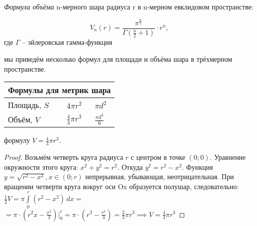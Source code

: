 \documentclass[14pt,a4paper]{report}
\begin{document}
\textit{Формула объёма} n-мерного шара радиуса r в n-мерном евклидовом пространстве:
\begin{my_frame}
$$ V_n(r)=\frac{\pi^\frac{n}{2}}{\Gamma(\frac{n}{2} + 1)}\cdot r^n, $$
где $ \Gamma $ -- эйлеровская гамма-функция \cite{olver2016nist}
\end{my_frame}

 мы приведём несколько формул для площади и объёма шара в трёхмерном пространстве.

\begin{center}
\begin{tabular}{ |p{3cm}|p{2cm}|p{2cm}|  }
    \hline
    \multicolumn{3}{|c|}{Формулы для метрик шара}\\
    \hline
    Площадь, $ S $ & $ 4\pi r^2 $ & $ \pi d^2 $\\[2ex]
    \hline
    Объём, $ V $ & $ \frac{4}{3} \pi r^3 $ & $ \frac{\pi d^3}{6} $\\[2ex]
    \hline
\end{tabular}
\end{center}

 формулу $ V = \frac{4}{3} \pi r^3 $.

\begin{my_frame-2.0}
\begin{proof}
    Возьмём четверть круга радиуса $ r $ с центром в точке $ (0; 0) $. Уравнение окружности этого круга: $ x^2 + y^2 = r^2$. Откуда $ y^2 = r^2 - x^2 $. Функция $ y = \sqrt{r^2 - x^2}, x \in (0; r) $ непрерывная, убывающая, неотрицательная. При вращении четверти круга вокруг оси Ox образуется полушар, следовательно: $ \frac{1}{2} V = \pi \int\limits_0^r (r^2 - x^2)\,dx = $ \\ $ = \pi \cdot (r^2x-\frac{x^3}{3})\bigg|_0^r = \pi \cdot (r^3-\frac{r^3}{3}) = \frac{2}{3}\pi r^3 \implies V = \frac{4}{3} \pi r^3 $
\end{proof}
\end{my_frame-2.0}
\end{document}
